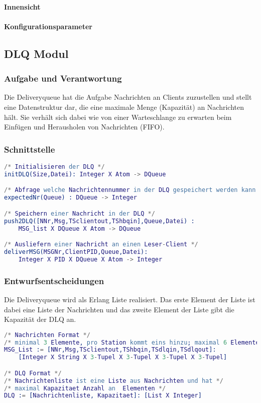 \documentclass{article}
\begin{document}
			\paragraph{Innensicht}
			\paragraph{Konfigurationsparameter}
			
\subsection{DLQ Modul}
\subsubsection{Aufgabe und Verantwortung}
Die Deliveryqueue hat die Aufgabe Nachrichten an Clients zuzustellen und stellt eine Datenstruktur dar, die eine maximale Menge (Kapazität) an Nachrichten hält. Sie verhält sich dabei wie von einer Warteschlange zu erwarten beim Einfügen und Herausholen von Nachrichten (FIFO).

\subsubsection{Schnittstelle}
\begin{lstlisting}[language=erlang]
/* Initialisieren der DLQ */
initDLQ(Size,Datei): Integer X Atom -> DQueue

/* Abfrage welche Nachrichtennummer in der DLQ gespeichert werden kann */
expectedNr(Queue) : DQueue -> Integer

/* Speichern einer Nachricht in der DLQ */
push2DLQ([NNr,Msg,TSclientout,TShbqin],Queue,Datei) :
    MSG_list X DQueue X Atom -> DQueue

/* Ausliefern einer Nachricht an einen Leser-Client */
deliverMSG(MSGNr,ClientPID,Queue,Datei):
    Integer X PID X DQueue X Atom -> Integer
\end{lstlisting}

\subsubsection{Entwurfsentscheidungen}
Die Deliveryqueue wird als Erlang Liste realisiert. Das erste Element der Liste ist dabei eine Liste der Nachrichten und das zweite Element der Liste gibt die Kapazität der DLQ an.
\begin{lstlisting}[language=erlang]
/* Nachrichten Format */
/* minimal 3 Elemente, pro Station kommt eins hinzu; maximal 6 Elemente */
MSG_List := [NNr,Msg,TSclientout,TShbqin,TSdlqin,TSdlqout]:
    [Integer X String X 3-Tupel X 3-Tupel X 3-Tupel X 3-Tupel]

/* DLQ Format */
/* Nachrichtenliste ist eine Liste aus Nachrichten und hat */
/* maximal Kapazitaet Anzahl an  Elementen */
DLQ := [Nachrichtenliste, Kapazitaet]: [List X Integer]
\end{lstlisting}
\end{document}

